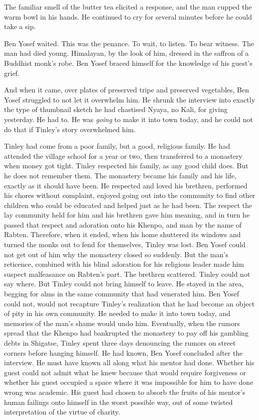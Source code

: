 \documentclass{amsart}
\begin{document}
The familiar smell of the butter tea elicited a response, and the man cupped the warm bowl in his hands. He continued to cry for several minutes before he could take a sip. 

Ben Yosef waited. This was the penance. To wait, to listen. To bear witness. The man had died young. Himalayan, by the look of him, dressed in the saffron of a Buddhist monk's robe. Ben Yosef braced himself for the knowledge of his guest's grief.

And when it came, over plates of preserved tripe and preserved vegetables, Ben Yosef struggled to not let it overwhelm him. He shrunk the interview into exactly the type of thumbnail sketch he had chastised Nyaya, no Kali, for giving yesterday. He had to. He was \emph{going} to make it into town today, and he could not do that if Tinley's story overwhelmed him. 

Tinley had come from a poor family, but a good, religious family. He had attended the village school for a year or two, then transferred to a monastery when money got tight. Tinley respected his family, as any good child does. But he does not remember them. The monastery became his family and his life, exactly as it should have been. He respected and loved his brethren, performed his chores without complaint, enjoyed going out into the community to find other children who could be educated and helped just as he had been. The respect the lay community held for him and his brethren gave him meaning, and in turn he passed that respect and adoration onto his Khenpo, and man by the name of Rabten. Therefore, when it ended, when his home shuttered its windows and turned the monks out to fend for themselves, Tinley was lost. Ben Yosef could not get out of him why the monastery closed so suddenly. But the man's reticence, combined with his blind adoration for his religious leader made him suspect malfeasance on Rabten's part. The brethren scattered. Tinley could not say where. But Tinley could not bring himself to leave. He stayed in the area, begging for alms in the same community that had venerated him. Ben Yosef could not, would not recapture Tinley's realization that he had become an object of pity in his own community. He needed to make it into town today, and memories of the man's shame would undo him. Eventually, when the rumors spread that the Khenpo had bankrupted the monastery to pay off his gambling debts in Shigatse, Tinley spent three days denouncing the rumors on street corners before hanging himself. He had known, Ben Yosef concluded after the interview. He must have known all along what his mentor had done. Whether his guest could not admit what he knew because that would require forgiveness or whether his guest occupied a space where it was impossible for him to have done wrong was academic. His guest had chosen to absorb the fruits of his mentor's human failings onto himself in the worst possible way, out of some twisted interpretation of the virtue of charity. 
\end{document}
